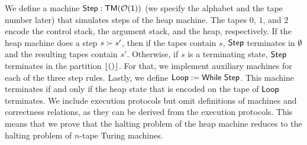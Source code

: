 We define a machine $\mathsf{Step} : \mathsf{TM}(\mathcal{O}(\mathsf{1}))$ (we specify the alphabet and the tape number later) that simulates steps of the heap machine.
The tapes $0$, $1$, and $2$ encode the control stack, the argument stack, and the heap, respectively.  If the heap machine does a step $s \succ s'$,
then if the tapes contain $s$, $\mathsf{Step}$ terminates in $\emptyset$ and the resulting tapes contain $s'$.  Otherwise, if $s$ is a terminating state,
$\mathsf{Step}$ terminates in the partition $\left\lfloor {\ensuremath{\mathsf{()}}} \right\rfloor$.  For that, we implement auxiliary machines for each of the three step rules.  Lastly, we define
$\mathsf{Loop} := \mathsf{While}~\mathsf{Step}$.  This machine terminates if and only if the heap state that is encoded on the tape of $\mathsf{Loop}$ terminates.  We
include execution protocols but omit definitions of machines and correctness relations, as they can be derived from the execution protocols.  This
means that we prove that the halting problem of the heap machine reduces to the halting problem of $n$-tape Turing machines.








